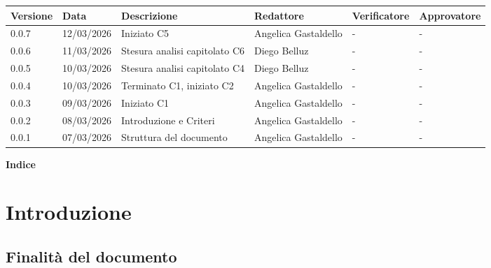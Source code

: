 \documentclass[a4paper,12pt]{article}
\begin{document}
\renewcommand{\arraystretch}{1.35}
\begin{center}
    {\footnotesize
    \begin{tabularx}{\textwidth}{|p{1.4cm}|p{1.8cm}|X|p{2.4cm}|p{2.3cm}|p{2.3cm}|}
        \hline
        \rowcolor{gray!20}
        \textbf{Versione} & \textbf{Data} & \textbf{Descrizione} & \textbf{Redattore} & \textbf{Verificatore} & \textbf{Approvatore} \\
        \hline
        0.0.7 & 12/03/2026 & Iniziato C5 & Angelica Gastaldello & - & - \\
        \hline
        0.0.6 & 11/03/2026 & Stesura analisi capitolato C6 & Diego Belluz & - & - \\
        \hline
        0.0.5 & 10/03/2026 & Stesura analisi capitolato C4 & Diego Belluz & - & - \\
        \hline
        0.0.4 & 10/03/2026 & Terminato C1, iniziato C2 & Angelica Gastaldello & - & - \\
        \hline
        0.0.3 & 09/03/2026 & Iniziato C1 & Angelica Gastaldello & - & - \\
        \hline
        0.0.2 & 08/03/2026 & Introduzione e Criteri & Angelica Gastaldello & - & - \\
        \hline
        0.0.1 & 07/03/2026 & Struttura del documento & Angelica Gastaldello & - & - \\
        \hline
    \end{tabularx}
    }
\end{center}
\newpage

\begin{center} 
    {\Large \textbf{Indice}}
\end{center}

\vspace{0.6cm}

\tableofcontents

\newpage

\setcounter{page}{4}

\section{Introduzione}
\subsection{Finalità del documento}
\end{document}
